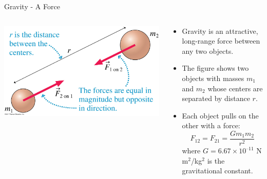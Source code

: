 \documentclass{beamer}
\begin{document}
\begin{frame}{Gravity - A Force}
\begin{columns}
\begin{column}{0.5\textwidth}
   \includegraphics[width=\textwidth]{../figures/06_06_Figure.jpg}
\end{column}
\begin{column}{0.5\textwidth}
\begin{itemize}
   \item Gravity is an attractive, long-range force between any two objects.
   \item The figure shows two objects with masses $m_1$ and $m_2$ whose centers are separated by distance $r$.
   \item Each object pulls on the other with a force:
   \begin{equation*}
      F_{12} = F_{21} = \frac{Gm_1m_2}{r^2}
   \end{equation*}
   where $G = 6.67 × 10^{–11}$ N m$^2$/kg$^2$ is the gravitational constant.
\end{itemize}
\end{column}
\end{columns}
\end{frame}
\end{document}
